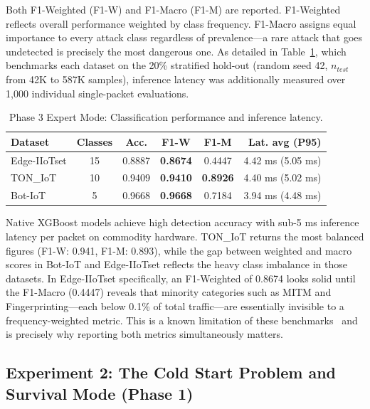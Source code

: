 \documentclass[conference]{IEEEtran}
\begin{document}
Both F1-Weighted (F1-W) and F1-Macro (F1-M) are reported. F1-Weighted reflects overall performance weighted by class frequency. F1-Macro assigns equal importance to every attack class regardless of prevalence---a rare attack that goes undetected is precisely the most dangerous one. As detailed in Table~\ref{tab:expert_results}, which benchmarks each dataset on the 20\% stratified hold-out (random seed 42, $n_{test}$ from 42K to 587K samples), inference latency was additionally measured over 1,000 individual single-packet evaluations.

\begin{table}[htbp]
    \centering
    \caption{Phase 3 Expert Mode: Classification performance and inference latency.}
    \label{tab:expert_results}
    \begin{tabular}{|l|c|c|c|c|r|}
        \hline
        \textbf{Dataset} & \textbf{Classes} & \textbf{Acc.} & \textbf{F1-W}   & \textbf{F1-M}   & \textbf{Lat. avg (P95)} \\
        \hline
        Edge-IIoTset     & 15               & 0.8887        & \textbf{0.8674} & 0.4447          & 4.42 ms (5.05 ms)       \\
        TON\_IoT         & 10               & 0.9409        & \textbf{0.9410} & \textbf{0.8926} & 4.40 ms (5.02 ms)       \\
        Bot-IoT          & 5                & 0.9668        & \textbf{0.9668} & 0.7184          & 3.94 ms (4.48 ms)       \\
        \hline
    \end{tabular}
\end{table}

Native XGBoost models achieve high detection accuracy with sub-5 ms inference latency per packet on commodity hardware. TON\_IoT returns the most balanced figures (F1-W: 0.941, F1-M: 0.893), while the gap between weighted and macro scores in Bot-IoT and Edge-IIoTset reflects the heavy class imbalance in those datasets. In Edge-IIoTset specifically, an F1-Weighted of 0.8674 looks solid until the F1-Macro (0.4447) reveals that minority categories such as MITM and Fingerprinting---each below 0.1\% of total traffic---are essentially invisible to a frequency-weighted metric. This is a known limitation of these benchmarks~\cite{ferrag2022edgeiiotset} and is precisely why reporting both metrics simultaneously matters.

\subsection{Experiment 2: The Cold Start Problem and Survival Mode (Phase 1)}
\label{subsec:exp2}
\end{document}
